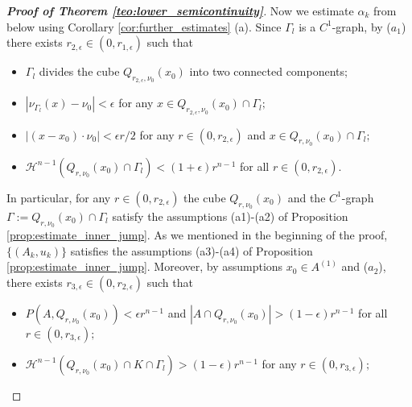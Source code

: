 \documentclass[reqno]{amsart}
\numberwithin{equation}{section}
\theoremstyle{plain}
\theoremstyle{definition}
\newcommand{\cH}{\mathcal{H}}
\begin{document}
\begin{proof}[\textbf{Proof of Theorem \ref{teo:lower_semicontinuity}}]
Now we estimate $\alpha_k$ from below using Corollary \ref{cor:further_estimates} (a). Since $\Gamma_l$ is a $C^1$-graph, by ($a_1$) there exists $r_{2,\epsilon}\in(0,r_{1,\epsilon})$ such that 
\begin{itemize}  
\item  $\Gamma_l$ divides the cube $Q_{r_{2,\epsilon},\nu_0}(x_0)$ into two connected components; 
 
\item  $|\nu_{\Gamma_l}(x) - \nu_0|<\epsilon$ for any $x\in Q_{r_{2,\epsilon},\nu_0}(x_0)\cap\Gamma_l;$
 
\item  $|(x-x_0)\cdot \nu_0| <\epsilon r/2$ for any $r\in (0,r_{2,\epsilon})$ and $x\in Q_{r,\nu_0}(x_0)\cap \Gamma_l;$ 
 
\item  $\cH^{n-1}(Q_{r,\nu_0}(x_0)\cap \Gamma_l) <(1+\epsilon)r^{n-1}$ for all $r\in(0,r_{2,\epsilon}).$
\end{itemize}
%
In particular, for any $r\in(0,r_{2,\epsilon})$ the cube $Q_{r,\nu_0}(x_0)$ and the $C^1$-graph $\Gamma:=Q_{r,\nu_0}(x_0)\cap \Gamma_l$ satisfy the assumptions (a1)-(a2) of Proposition \ref{prop:estimate_inner_jump}. As we mentioned in the beginning of the proof, $\{(A_k,u_k)\}$ satisfies the assumptions (a3)-(a4) of Proposition \ref{prop:estimate_inner_jump}.
Moreover, by assumptions $x_0\in A^{(1)}$ and ($a_2$), there exists $r_{3,\epsilon}\in(0,r_{2,\epsilon})$ such that

\begin{itemize}

\item  $P(A,Q_{r,\nu_0}(x_0))< \epsilon r^{n-1}$ and $|A\cap Q_{r,\nu_0}(x_0)|>(1-\epsilon)r^{n-1}$ for all $r\in(0,r_{3,\epsilon});$
  
\item  $\cH^{n-1}(Q_{r,\nu_0}(x_0)\cap K\cap \Gamma_l)>(1-\epsilon)r^{n-1}$  for any $r\in(0,r_{3,\epsilon});$ 
 

\end{itemize}
\end{proof}
\end{document}
